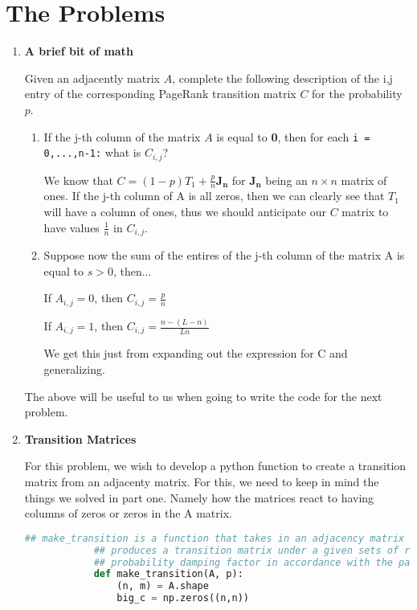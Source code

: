 \documentclass[11pt]{article}
\begin{document}
    \section{The Problems}
    \begin{enumerate}
        \item  \textbf{A brief bit of math}

          Given an adjacently matrix $A$, complete the following
          description of the i,j entry of the corresponding PageRank
          transition matrix $C$ for the probability $p$.
          \begin{enumerate}
              \item If the j-th column of the matrix $A$ is equal to
                  \textbf{0}, then for each \lstinline{i = 0,...,n-1:} what is
                  $C_{i,j}$?

                  We know that $C = (1-p)T_1 + \frac{p}{n} \mathbf{J_n}$ for
                  $\mathbf{J_n}$ being an $n \times n$ matrix of ones. If the
                  j-th column of A is all zeros, then we can clearly see that
                  $T_1$ will have a column of ones, thus we should anticipate
                  our $C$ matrix to have values $\frac{1}{n} $ in $C_{i,j}$. 

              \item Suppose now the sum of the entires of the j-th column of
                  the matrix A is equal to $s > 0$, then...

                  If $A_{i,j} = 0$, then $C_{i,j} = \frac{p}{n}$

                  If $A_{i,j} = 1$, then $C_{i,j} = \frac{n-(L-n)}{Ln}$ 

                  We get this just from expanding out the expression for C and
                  generalizing.
          \end{enumerate}

      The above will be useful to us when going to write the code for the next
      problem.

      \item \textbf{Transition Matrices}

        For this problem, we wish to develop a python function to create a
        transition matrix from an adjacenty matrix. For this, we need to keep
        in mind the things we solved in part one. Namely how the matrices react
        to having columns of zeros or zeros in the A matrix.
        \begin{lstlisting}[style=mystyle, linewidth=0.94\linewidth,
                           language=Python, gobble=8, caption=make\_transition]
            ## make_transition is a function that takes in an adjacency matrix and
            ## produces a transition matrix under a given sets of rules and using a
            ## probability damping factor in accordance with the pagerank system
            def make_transition(A, p):
                (n, m) = A.shape
                big_c = np.zeros((n,n))
            

\end{lstlisting}
\end{enumerate}
\end{document}
